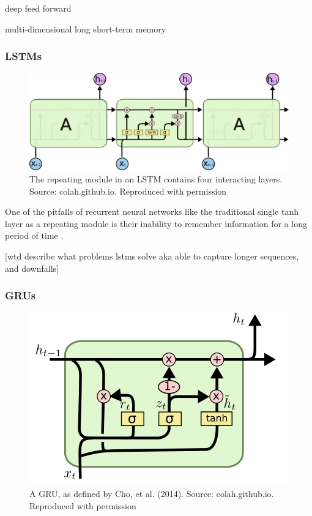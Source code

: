 deep feed forward

multi-dimensional long short-term memory 






\subsubsection{LSTMs}

\begin{figure}[h]
    \centering
	\includegraphics[width=.8\textwidth]{./images/illustrations/LSTM3}
    \caption{The repeating module in an LSTM contains four interacting layers. Source: colah.github.io. Reproduced with permission}
    \label{fig:mesh1}
\end{figure}


One of the pitfalls of recurrent neural networks like the traditional single tanh layer as a repeating module is their inability to remember information for a long period of time \cite{Hochreiter:1997:LSM:1246443.1246450}.

[wtd describe what problems lstms solve aka able to capture longer sequences, and downfalls]

\subsubsection{GRUs}

\begin{figure}[h]
    \centering
	\includegraphics[width=.8\textwidth]{./images/illustrations/GRU}
    \caption{A GRU, as defined by Cho, et al. (2014). Source: colah.github.io. Reproduced with permission}
    \label{fig:mesh1}
\end{figure}




